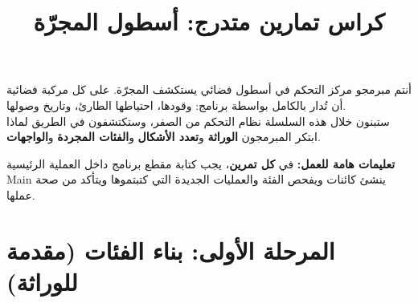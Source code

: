 \documentclass[14pt]{extarticle}
\title{كراس تمارين متدرج: أسطول المجرّة}
\begin{document}
\maketitle
\thispagestyle{fancy}

\begin{boxDef}
أنتم مبرمجو مركز التحكم في أسطول فضائي يستكشف المجرّة. على كل مركبة فضائية أن تُدار بالكامل بواسطة برنامج: وقودها، احتياطها الطارئ، وتاريخ وصولها. \\
ستبنون خلال هذه السلسلة نظام التحكم من الصفر، وستكتشفون في الطريق لماذا ابتكر المبرمجون \textbf{الوراثة} و\textbf{تعدد الأشكال} و\textbf{الفئات المجردة} و\textbf{الواجهات}.
\end{boxDef}

\begin{boxWarning}
\textbf{تعليمات هامة للعمل:}
في \textbf{كل تمرين}، يجب كتابة مقطع برنامج داخل العملية الرئيسية \textenglish{Main} ينشئ كائنات ويفحص الفئة والعمليات الجديدة التي كتبتموها ويتأكد من صحة عملها.
\end{boxWarning}

\section*{المرحلة الأولى: بناء الفئات (مقدمة للوراثة)}
\end{document}
